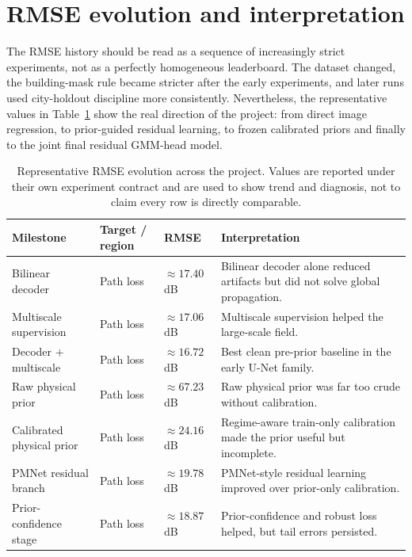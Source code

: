 \section{RMSE evolution and interpretation}

The RMSE history should be read as a sequence of increasingly strict
experiments, not as a perfectly homogeneous leaderboard. The dataset changed,
the building-mask rule became stricter after the early experiments, and later
runs used city-holdout discipline more consistently. Nevertheless, the
representative values in Table~\ref{tab:rmse_evolution} show the real
direction of the project: from direct image regression, to prior-guided
residual learning, to frozen calibrated priors and finally to the joint final
residual GMM-head model.

\begin{table}[H]
\centering
\caption[Representative RMSE evolution across the project.]%
{Representative RMSE evolution across the project. Values are reported
under their own experiment contract and are used to show trend and diagnosis,
not to claim every row is directly comparable.}
\label{tab:rmse_evolution}
\small
\setlength{\tabcolsep}{3pt}
\begin{tabularx}{\textwidth}{@{}
  >{\raggedright\arraybackslash}p{2.2cm}
  >{\raggedright\arraybackslash}p{2.6cm}
  >{\raggedright\arraybackslash}p{3.0cm}
  >{\raggedright\arraybackslash}X
@{}}
\toprule
Milestone & Target / region & RMSE & Interpretation \\
\midrule
Bilinear decoder & Path loss & \(\approx 17.40\) dB & Bilinear decoder alone reduced artifacts but did not solve global propagation. \\
Multiscale supervision & Path loss & \(\approx 17.06\) dB & Multiscale supervision helped the large-scale field. \\
Decoder + multiscale & Path loss & \(\approx 16.72\) dB & Best clean pre-prior baseline in the early U-Net family. \\
Raw physical prior & Path loss & \(\approx 67.23\) dB & Raw physical prior was far too crude without calibration. \\
Calibrated physical prior & Path loss & \(\approx 24.16\) dB & Regime-aware train-only calibration made the prior useful but incomplete. \\
PMNet residual branch & Path loss & \(\approx 19.78\) dB & PMNet-style residual learning improved over prior-only calibration. \\
Prior-confidence stage & Path loss & \(\approx 18.87\) dB & Prior-confidence and robust loss helped, but tail errors persisted. \\

\end{tabularx}
\end{table}
